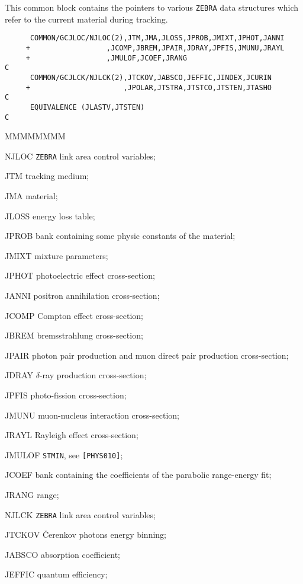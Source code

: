 
This common block contains the pointers to various {\tt ZEBRA} data
structures which refer to the current material during tracking.
\begin{verbatim}
      COMMON/GCJLOC/NJLOC(2),JTM,JMA,JLOSS,JPROB,JMIXT,JPHOT,JANNI
     +                  ,JCOMP,JBREM,JPAIR,JDRAY,JPFIS,JMUNU,JRAYL
     +                  ,JMULOF,JCOEF,JRANG
C
      COMMON/GCJLCK/NJLCK(2),JTCKOV,JABSCO,JEFFIC,JINDEX,JCURIN
     +                      ,JPOLAR,JTSTRA,JTSTCO,JTSTEN,JTASHO
C
      EQUIVALENCE (JLASTV,JTSTEN)
C
\end{verbatim}
\begin{DLtt}{MMMMMMMM}
\item[NJLOC]  {\tt ZEBRA} link area control variables;
\item[JTM] tracking medium;
\item[JMA] material;
\item[JLOSS] energy loss table;
\item[JPROB] bank containing some physic constants of 
the material;
\item[JMIXT] mixture parameters;
\item[JPHOT] photoelectric effect cross-section;
\item[JANNI] positron annihilation cross-section;
\item[JCOMP] Compton effect cross-section;
\item[JBREM] bremsstrahlung cross-section;
\item[JPAIR] photon pair production and muon direct pair
production cross-section;
\item[JDRAY] $\delta$-ray production cross-section;
\item[JPFIS] photo-fission cross-section;
\item[JMUNU] muon-nucleus interaction cross-section;
\item[JRAYL] Rayleigh effect cross-section;
\item[JMULOF] {\tt STMIN}, see {\tt [PHYS010]};
\item[JCOEF] bank containing the coefficients of the parabolic 
range-energy fit;
\item[JRANG] range;
\item[NJLCK] {\tt ZEBRA} link area control variables;
\item[JTCKOV] \v{C}erenkov photons energy binning;
\item[JABSCO] absorption coefficient;
\item[JEFFIC] quantum efficiency;

\end{DLtt}
